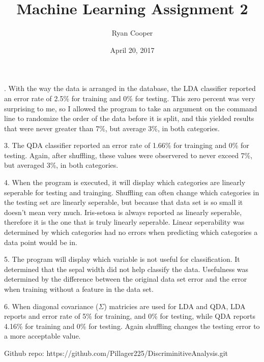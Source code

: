 \documentclass{article}
\begin{document}
\title{Machine Learning Assignment 2}
\author{Ryan Cooper}
\date{April 20, 2017}
. With the way the data is arranged in the database, the LDA classifier reported an error rate of 2.5\% for training and 0\% for testing. This zero percent was very surprising to me, so I allowed the program to take an argument on the command line to randomize the order of the data before it is split, and this yielded results that were never greater than 7\%, but average 3\%, in both categories.\par

3. The QDA classifier reported an error rate of 1.66\% for trainging and 0\% for testing. Again, after shuffling, these values were observered to never exceed 7\%, but averaged 3\%, in both categories.\par

4. When the program is executed, it will display which categories are linearly seperable for testing and trainging. Shuffling can often change which categories in the testing set are linearly seperable, but because that data set is so small it doesn't mean very much. Iris-setosa is always reported as linearly seperable, therefore it is the one that is truly linearly seperable. Linear seperability was determined by which categories had no errors when predicting which categories a data point would be in.\par

5. The program will display which variable is not useful for classification. It determined that the sepal width did not help classify the data. Usefulness was determined by the difference between the original data set error and the error when training without a feature in the data set.\par

6. When diagonal covariance (\(\Sigma\)) matricies are used for LDA and QDA, LDA reports and error rate of 5\% for training, and 0\% for testing, while QDA reports 4.16\% for training and 0\% for testing. Again shuffling changes the testing error to a more acceptable value.\par
\vspace{.2cm}
Github repo: https://github.com/Pillager225/DiscriminitiveAnalysis.git
\end{document}
